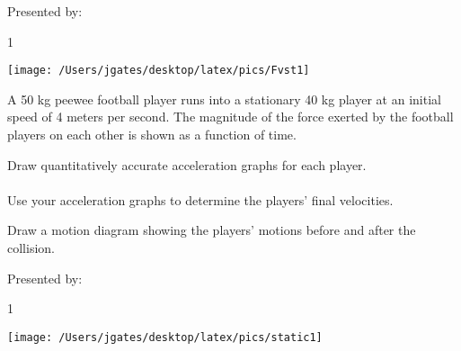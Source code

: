 \bigskip
{\large Presented by: }\underline{\hspace{5cm}}




\vfill
\newpage


\AddToShipoutPicture*{\BackgroundPic}

\addtocounter {ProbNum} {1}

\begin{floatingfigure}[r]{.54\textwidth}
\texttt{[image: /Users/jgates/desktop/latex/pics/Fvst1]}
\end{floatingfigure}
 
{\bf \Large{}} A 50 kg peewee football player runs into a stationary 40 kg player at an initial speed of 4 meters per second. The magnitude of the force exerted by the football players on each other is shown as a function of time. 

\bigskip
Draw quantitatively accurate acceleration graphs for each player.
\paragraph{}
\noindent
\vfill
Use your acceleration graphs to determine the players' final velocities.
\vfill

Draw a motion diagram showing the players' motions before and after the collision.
\vspace{20mm}

\newpage

\AddToShipoutPicture*{\BackgroundPic}


\bigskip
{\large Presented by: }\underline{\hspace{5cm}}




\vfill
\newpage


\AddToShipoutPicture*{\BackgroundPic}

\addtocounter {ProbNum} {1}

\begin{floatingfigure}[r]{.45\textwidth}
\texttt{[image: /Users/jgates/desktop/latex/pics/static1]}
\end{floatingfigure}
 
